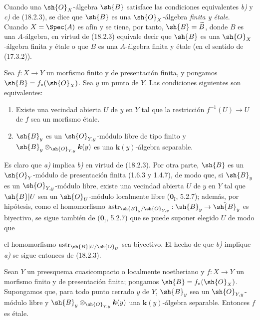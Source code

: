 Cuando una $\sh{O}_X$-álgebra $\sh{B}$ satisface las condiciones equivalentes \emph{b)} y \emph{c)} de (18.2.3), se dice que $\sh{B}$ es una $\sh{O}_X$-álgebra \emph{finita y étale}. Cuando $X=\Spec(A)$ es afín y se tiene, por tanto, $\sh{B}=\widetilde B$, donde $B$ es una $A$-álgebra, en virtud de (18.2.3) equivale decir que $\sh{B}$ es una $\sh{O}_X$-álgebra finita y étale o que $B$ es una $A$-álgebra finita y étale (en el sentido de (17.3.2)).

\begin{corollary}[18.2.4]
\label{IV.18.2.4}
Sea $f:X\to Y$ un morfismo finito y de presentación finita, y pongamos $\sh{B}=f_*(\sh{O}_X)$. Sea $y$ un punto de $Y$. Las condiciones siguientes son equivalentes:
\begin{enumerate}
  \item[\textup{a)}] Existe una vecindad abierta $U$ de $y$ en $Y$ tal que la restricción $f^{-1}(U)\to U$ de $f$ sea un morfismo étale.
  \item[\textup{b)}] $\sh{B}_y$ es un $\sh{O}_{Y,y}$-módulo libre de tipo finito y $\sh{B}_y\otimes_{\sh{O}_{Y,y}}\boldsymbol{k}(y)$ es una $\boldsymbol{k}(y)$-álgebra separable.
\end{enumerate}
\end{corollary}

Es claro que \emph{a)} implica \emph{b)} en virtud de (18.2.3). Por otra parte, $\sh{B}$ es un $\sh{O}_Y$-módulo de presentación finita (1.6.3 y 1.4.7), de modo que, si $\sh{B}_y$ es un $\sh{O}_{Y,y}$-módulo libre, existe una vecindad abierta $U$ de $y$ en $Y$ tal que $\sh{B}|U$ sea un $\sh{O}_U$-módulo localmente libre ($\mathbf{0}_{\mathrm I}$, 5.2.7); además, por hipótesis, como el homomorfismo $\operatorname{astr}_{\sh{B}_y/\sh{O}_{Y,y}}:\sh{B}_y\to\check{\sh{B}}_y$ es biyectivo, se sigue también de ($\mathbf{0}_{\mathrm I}$, 5.2.7) que se puede suponer elegido $U$ de modo que


el homomorfismo $\operatorname{astr}_{\sh{B}|U/\sh{O}_U}$ sea biyectivo. El hecho de que \emph{b)} implique \emph{a)} se sigue entonces de (18.2.3).

\begin{corollary}[18.2.5]
\label{IV.18.2.5}
Sean $Y$ un preesquema cuasicompacto o localmente noetheriano y $f:X\to Y$ un morfismo finito y de presentación finita; pongamos $\sh{B}=f_*(\sh{O}_X)$. Supongamos que, para todo punto cerrado $y$ de $Y$, $\sh{B}_y$ sea un $\sh{O}_{Y,y}$-módulo libre y $\sh{B}_y\otimes_{\sh{O}_{Y,y}}\boldsymbol{k}(y)$ una $\boldsymbol{k}(y)$-álgebra separable. Entonces $f$ es étale.
\end{corollary}

